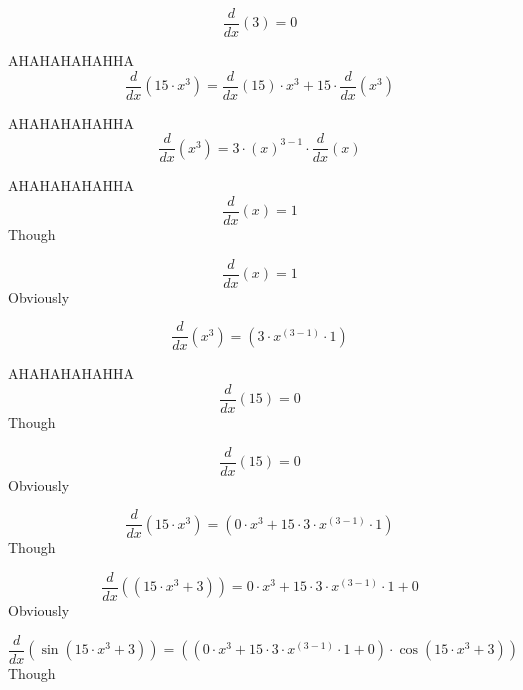 \documentclass[12pt,a4paper]{extreport}
\begin{document}
\begin{dmath*}
    \frac{d}{dx} \left(3\right) = 0
\end{dmath*}

AHAHAHAHAHHA
\begin{dmath*}
    \frac{d}{dx}\left(15\cdot x^{3}\right) = \frac{d}{dx}\left(15\right) \cdot x^{3} + 15 \cdot \frac{d}{dx}\left(x^{3}\right)
\end{dmath*}

AHAHAHAHAHHA
\begin{dmath*}
    \frac{d}{dx}\left(x^{3}\right) = 3 \cdot \left(x\right)^{3 -  1 } \cdot \frac{d}{dx}\left(x\right)
\end{dmath*}

AHAHAHAHAHHA
\begin{dmath*}
    \frac{d}{dx}\left(x\right) =  1 
\end{dmath*}
Though


\begin{dmath*}
    \frac{d}{dx} \left(x\right) = 1
\end{dmath*}
Obviously


\begin{dmath*}
    \frac{d}{dx} \left(x^{3}\right) = \left(3\cdot x^{\left(3-1\right)}\cdot 1\right)
\end{dmath*}

AHAHAHAHAHHA
\begin{dmath*}
    \frac{d}{dx}\left(15\right) =  0 
\end{dmath*}
Though


\begin{dmath*}
    \frac{d}{dx} \left(15\right) = 0
\end{dmath*}
Obviously


\begin{dmath*}
    \frac{d}{dx} \left(15\cdot x^{3}\right) = \left(0\cdot x^{3}+15\cdot 3\cdot x^{\left(3-1\right)}\cdot 1\right)
\end{dmath*}
Though


\begin{dmath*}
    \frac{d}{dx} \left(\left(15\cdot x^{3}+3\right)\right) = 0\cdot x^{3}+15\cdot 3\cdot x^{\left(3-1\right)}\cdot 1+0
\end{dmath*}
Obviously


\begin{dmath*}
    \frac{d}{dx} \left(\sin \left(15\cdot x^{3}+3\right)\right) = \left(\left(0\cdot x^{3}+15\cdot 3\cdot x^{\left(3-1\right)}\cdot 1+0\right)\cdot \cos \left(15\cdot x^{3}+3\right)\right)
\end{dmath*}
Though
\end{document}

